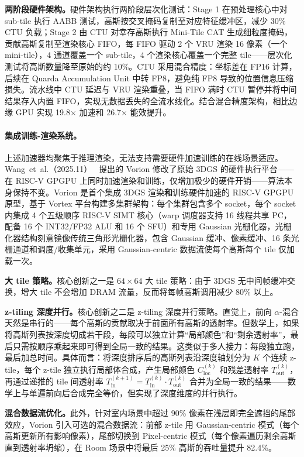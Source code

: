 \textbf{两阶段硬件架构。}硬件架构执行两阶段层次化测试：Stage 1 在预处理核心中对 sub-tile 执行 AABB 测试，高斯按交叉掩码复制至对应特征缓冲区，减少 30\% CTU 负载；Stage 2 由 CTU 对幸存高斯执行 Mini-Tile CAT 生成细粒度掩码，贡献高斯复制至渲染核心 FIFO，每 FIFO 驱动 2 个 VRU 渲染 16 像素（一个 mini-tile），4 通道覆盖一个 sub-tile，4 个渲染核心覆盖一个完整 tile——层次化测试将高斯数量降至原始的约 10\%。CTU 采用混合精度：坐标差在 FP16 计算，后续在 Quarda Accumulation Unit 中转 FP8，避免纯 FP8 导致的位置信息压缩损失。流水线中 CTU 延迟与 VRU 渲染重叠，当 FIFO 满时 CTU 暂停并将中间结果存入内置 FIFO，实现无数据丢失的全流水线化。结合混合精度架构，相比边缘 GPU 实现 19.8$\times$ 加速和 26.7$\times$ 能效提升。

\paragraph{集成训练-渲染系统。}

上述加速器均聚焦于推理渲染，无法支持需要硬件加速训练的在线场景适应。Wang~et~al.（2025.11）~\cite{2511_16831} 提出的 Vorion 修改了原始 3DGS 的硬件执行平台——在 RISC-V GPGPU 上同时加速渲染和训练，仅增加极少的硬件开销——算法本身保持不变。Vorion 是首个集成 3DGS 渲染\textbf{和}训练硬件加速的 RISC-V GPGPU 原型，基于 Vortex 平台构建多集群架构：每个集群包含多个 socket，每个 socket 内集成 4 个五级顺序 RISC-V SIMT 核心（warp 调度器支持 16 线程共享 PC，配备 16 个 INT32/FP32 ALU 和 16 个 SFU）和专用 Gaussian 光栅化器，光栅化器结构刻意镜像传统三角形光栅化器，包含 Gaussian 缓冲、像素缓冲、16 条光栅通道和调度/收集单元，采用 Gaussian-centric 数据流使每个高斯每个 tile 仅加载一次。

\textbf{大 tile 策略。}核心创新之一是 $64{\times}64$ 大 tile 策略：由于 3DGS 无中间帧缓冲交换，增大 tile 不会增加 DRAM 流量，反而将每帧高斯调用减少 80\% 以上。

\textbf{z-tiling 深度并行。}核心创新之二是 z-tiling 深度并行策略。直觉上，前向 $\alpha$-混合 天然是串行的——每个高斯的贡献取决于前面所有高斯的透射率。但数学上，如果将高斯列表按深度切成若干段，每段可以独立计算“局部颜色”和“剩余透射率”，最后只需按顺序乘起来即可得到全局一致的结果。这类似于多人接力：每段独立跑，最后加总时间。具体而言：将深度排序后的高斯列表沿深度轴划分为 $K$ 个连续 z-tile，每个 z-tile 独立执行局部体合成，产生局部颜色 $C_\text{loc}^{(k)}$ 和残差透射率 $T_\text{out}^{(k)}$，再通过递推的 tile 间透射率 $T_\text{in}^{(k+1)}=T_\text{in}^{(k)}\cdot T_\text{out}^{(k)}$ 合并为全局一致的结果——数学上与单遍前向后合成完全等价，但实现了深度维度的并行执行。

\textbf{混合数据流优化。}此外，针对室内场景中超过 90\% 像素在浅层即完全遮挡的尾部效应，Vorion 引入可选的混合数据流：前部 z-tile 用 Gaussian-centric 模式（每个高斯更新所有影响像素），尾部切换到 Pixel-centric 模式（每个像素遍历剩余高斯直到透射率坍缩），在 Room 场景中将最后 25\% 高斯的吞吐量提升 82.4\%。

